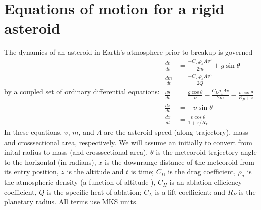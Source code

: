 \documentclass[letterpaper,10pt,english]{sphinxmanual}
\begin{document}
\section{Equations of motion for a rigid asteroid}
\label{\detokenize{index:equations-of-motion-for-a-rigid-asteroid}}
\sphinxAtStartPar
The dynamics of an asteroid in Earth’s atmosphere prior to break\sphinxhyphen{}up is
governed by a coupled set of ordinary differential equations:
\begin{math}
\begin{aligned}
\frac{dv}{dt} & = \frac{-C_D\rho_a A v^2}{2 m} + g \sin \theta \\
\frac{dm}{dt} & = \frac{-C_H\rho_a A v^3}{2 Q} \\
\frac{d\theta}{dt} & = \frac{g\cos\theta}{v} - \frac{C_L\rho_a A v}{2 m} - \frac{v\cos\theta}{R_P + z} \\
\frac{dz}{dt} & = -v\sin\theta \\
\frac{dx}{dt} & = \frac{v\cos\theta}{1 + z/R_P}
\end{aligned}
\end{math}
\sphinxAtStartPar
In these equations, \(v\), \(m\), and \(A\) are the asteroid
speed (along trajectory), mass and cross\sphinxhyphen{}sectional area, respectively.
We will assume an initially  to convert from
inital radius to mass (and cross\sphinxhyphen{}sectional area). \(\theta\) is the
meteoroid trajectory angle to the horizontal (in radians), \(x\) is
the downrange distance of the meteoroid from its entry position,
\(z\) is the altitude and \(t\) is time; \(C_D\) is the drag
coefficient, \(\rho_a\) is the atmospheric density (a function of
altitude ), \(C_H\) is an ablation efficiency coefficient, \(Q\)
is the specific heat of ablation; \(C_L\) is a lift coefficient; and
\(R_P\) is the planetary radius. All terms use MKS units.
\end{document}
